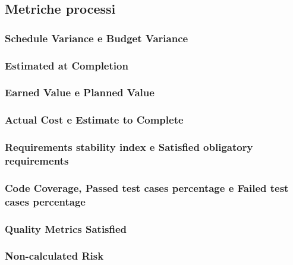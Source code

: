 \subsection{Metriche processi}
\subsubsection{Schedule Variance e Budget Variance}
\subsubsection{Estimated at Completion}
\subsubsection{Earned Value e Planned Value}
\subsubsection{Actual Cost e Estimate to Complete}
\subsubsection{Requirements stability index e Satisﬁed obligatory requirements}
\subsubsection{Code Coverage, Passed test cases percentage e Failed test cases percentage}
\subsubsection{Quality Metrics Satisﬁed}
\subsubsection{Non-calculated Risk}
